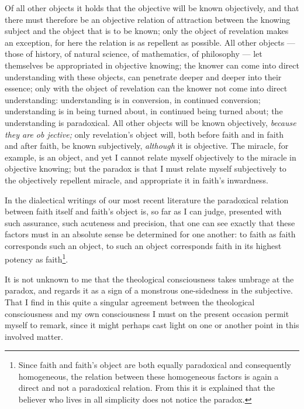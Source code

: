 \documentclass[12pt,a4paper]{book}
\begin{document}
Of all other objects it holds that the objective will be known objectively, and that there must
therefore be an objective relation of attraction between the knowing subject and the object that
is to be known; only the object of revelation makes an exception, for here the relation is as
repellent as possible. All other objects --- those of history, of natural science, of mathematics,
of philosophy --- let themselves be appropriated in objective knowing; the knower can come into
direct understanding with these objects, can penetrate deeper and deeper into their essence; only
with the object of revelation can the knower not come into direct understanding: understanding is
in conversion, in continued conversion; understanding is in being turned about, in continued being
turned about; the understanding is paradoxical. All other objects will be known objectively,
\emph{because they are ob%
jective;} only revelation's object will, both before faith and in faith and after faith, be known
subjectively, \emph{although} it is objective.
The miracle, for example, is an object, and yet I cannot relate myself objectively to the miracle
in objective knowing; but the paradox is that I must relate myself subjectively to the objectively
repellent miracle, and appropriate it in faith's inwardness.

In the dialectical writings of our most recent literature the paradoxical relation between faith
itself and faith's object is, so far as I can judge, presented with such assurance, such acuteness
and precision, that one can see exactly that these factors must in an absolute sense be determined
for one another: to faith as faith corresponds such an object, to such an object corresponds faith
in its highest potency as faith\footnote{Since faith and faith's object are both equally
paradoxical and consequently homogeneous, the relation between these homogeneous factors is again a
direct and not a paradoxical relation. From this it is explained that the believer who lives in all
simplicity does not notice the paradox.}.

It is not unknown to me that the theological consciousness takes umbrage at the paradox, and
regards it as a sign of a monstrous one-sidedness in the subjective. That I find in this quite a
singular agreement between the theological consciousness and my own consciousness I must on the
present occasion permit myself to remark, since it might perhaps cast light on one or another point
in this involved matter.
\end{document}
